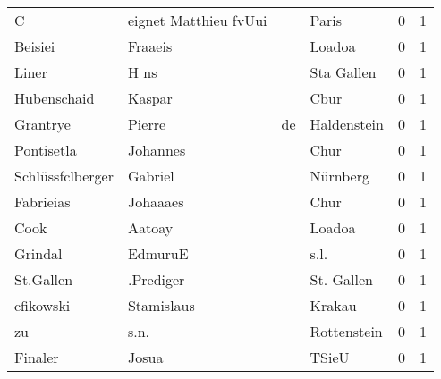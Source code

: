 \begin{center}
\begin{tiny}
\begin{longtabu}{llllrr}
                        C &              eignet Matthieu fvUui &             &                                       Paris &          0 &         1 \\
                  Beisiei &                            Fraaeis &             &                                      Loadoa &          0 &         1 \\
                    Liner &                               H ns &             &                                  Sta Gallen &          0 &         1 \\
              Hubenschaid &                             Kaspar &             &                                        Cbur &          0 &         1 \\
                 Grantrye &                             Pierre &          de &                                 Haldenstein &          0 &         1 \\
               Pontisetla &                           Johannes &             &                                        Chur &          0 &         1 \\
         Schlüssfclberger &                            Gabriel &             &                                    Nürnberg &          0 &         1 \\
                Fabrieias &                           Johaaaes &             &                                        Chur &          0 &         1 \\
                     Cook &                             Aatoay &             &                                      Loadoa &          0 &         1 \\
                  Grindal &                            EdmuruE &             &                                        s.l. &          0 &         1 \\
                St.Gallen &                          .Prediger &             &                                  St. Gallen &          0 &         1 \\
                cfikowski &                         Stamislaus &             &                                      Krakau &          0 &         1 \\
                       zu &                               s.n. &             &                                 Rottenstein &          0 &         1 \\
                  Finaler &                              Josua &             &                                       TSieU &          0 &         1 \\

\end{longtabu}
\end{tiny}
\end{center}

